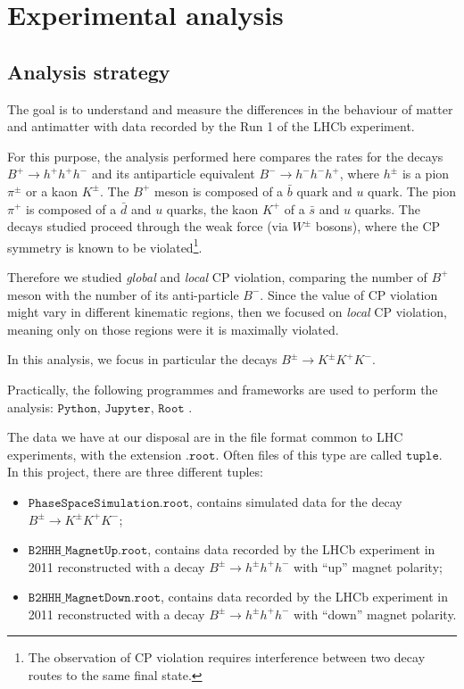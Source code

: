 \chapter{Experimental analysis}\label{chap:03}
\section{Analysis strategy}

The goal is to understand and measure the differences in the
behaviour of matter and antimatter with data recorded by the Run 1 of the LHCb experiment.

For this purpose, the analysis performed here compares the rates for the decays $B^{+} \rightarrow h^{+} h^{+} h^{-}$ and its antiparticle equivalent $B^{-} \rightarrow h^{-} h^{-} h^{+}$, where $h^{\pm}$ is a pion $\pi^{\pm}$ or a kaon $K^{\pm}$. The $B^{+}$ meson is composed of a $\bar{b}$ quark and $u$ quark. The pion $\pi^{+}$ is composed of a $\bar{d}$ and $u$ quarks, the kaon $K^{+}$ of a $\bar{s}$ and $u$ quarks. The decays studied proceed through the weak force (via $W^{\pm}$ bosons), where the CP symmetry is known to be violated\footnote{The observation of CP violation requires interference between two decay routes to the same final state.}.

Therefore we studied \emph{global} and \emph{local} CP violation, comparing the number of $B^{+}$ meson with the number of its anti-particle $B^{-}$. Since the value of CP violation might vary in different kinematic regions, then we focused on \emph{local} CP violation, meaning only on those regions were it is maximally violated.

In this analysis, we focus in particular the decays  $B^{\pm} \rightarrow K^{\pm} K^{+} K^{-}$.

Practically, the following programmes and frameworks are used to perform the analysis:
\href{https://www.python.org/}{$\texttt{Python}$},
\href{https://jupyter.org/}{$\texttt{Jupyter}$},
\href{https://root.cern/}{$\texttt{Root}$} \cite{brun1997root}.

The data we have at our disposal are in the file format common to LHC experiments, with the extension $\texttt{.root}$. Often files of this type are called \href{https://root.cern/doc/master/md_tree_2ntuple_2v7_2doc_2README.html}{$\texttt{tuple}$}. In this project, there are three different tuples:

\begin{itemize}
    \item $\texttt{PhaseSpaceSimulation.root}$, contains simulated data for the decay $B^{\pm} \rightarrow K^{\pm} K^{+} K^{-}$;
    \item $\texttt{B2HHH\_MagnetUp.root}$, contains data recorded by the LHCb experiment in 2011 reconstructed with a decay $B^{\pm} \rightarrow h^{\pm} h^{+} h^{-}$ with \enquote{up} magnet polarity;
    \item $\texttt{B2HHH\_MagnetDown.root}$, contains data recorded by the LHCb experiment in 2011 reconstructed with a decay $B^{\pm} \rightarrow h^{\pm} h^{+} h^{-}$ with \enquote{down} magnet polarity.
\end{itemize}


